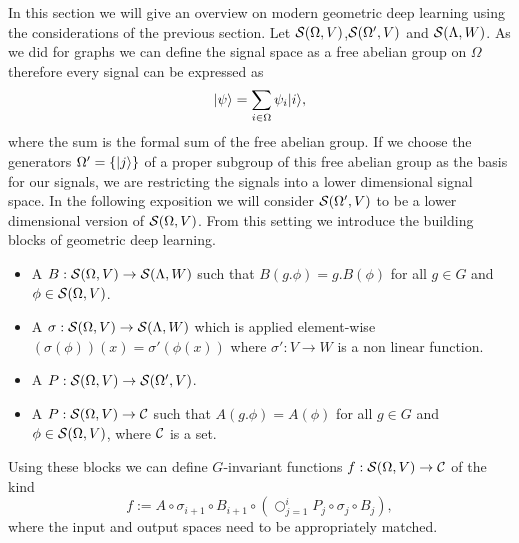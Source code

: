 \documentclass[../3.tex]{subfiles}
\begin{document}
    In this section we will give an overview on modern geometric deep learning using the considerations of the previous section.
    Let $\mathcal{S}(\Omega,V)$,$\mathcal{S}(\Omega',V)$ and $\mathcal{S}(\Lambda,W)$.
    {\color{blue}
    As we did for graphs we can define the signal space as a free abelian group on $\Omega$ therefore every signal can be expressed as 
    \[ | \psi \rangle = \sum_{i \in \Omega} \psi_i| i \rangle, \]
    where the sum is the formal sum of the free abelian group.
    If we choose the generators $\Omega' = \{| j \rangle\}$ of a proper subgroup of this free abelian 
    group as the basis for our signals, we are restricting the signals into a lower dimensional signal space.
    In the following exposition we will consider $\mathcal{S}(\Omega',V)$ to be a lower dimensional version of $\mathcal{S}(\Omega,V)$.}
    From this setting we introduce the building blocks of geometric deep learning.

    \begin{itemize}
        \item A  $B : \mathcal{S}(\Omega,V) \to \mathcal{S}(\Lambda,W)$ such that
            $B(g.\phi) = g.B(\phi)$ for all $g \in G$ and $\phi \in \mathcal{S}(\Omega,V)$.
        \item A  $\sigma : \mathcal{S}(\Omega,V) \to \mathcal{S}(\Lambda,W)$ which is applied element-wise 
            $(\sigma(\phi))(x) = \sigma'(\phi(x))$ where $\sigma' : V \to W$ is a non linear function.
        \item A  $P : \mathcal{S}(\Omega,V) \to \mathcal{S}(\Omega',V)$.
        \item A  $P : \mathcal{S}(\Omega,V) \to \mathcal{C}$ such that $A(g.\phi) = A(\phi)$ for all $g \in G$ 
        and $\phi \in \mathcal{S}(\Omega,V)$, where $\mathcal{C}$ is a set.
    \end{itemize}

    Using these blocks we can define $G$-invariant functions $f : \mathcal{S}(\Omega,V) \to \mathcal{C}$ of the kind
    \[ f := A \circ \sigma_{i+1} \circ B_{i+1} \circ (\bigcirc_{j = 1}^i P_j \circ \sigma_j \circ B_j ) , \]
    where the input and output spaces need to be appropriately matched.

\end{document}
